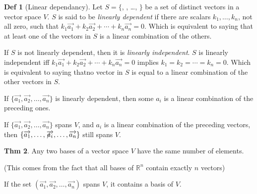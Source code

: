 \documentclass{article}
\theoremstyle{definition}
\newtheorem{definition}{Def}[section]
\newtheorem{theorem}[definition]{Thm}
\newcommand{\crossover}{\hspace{-0pt}\not\hspace{-2pt}}
\begin{document}
\begin{definition}[Linear dependancy]
    Let $S = \{$, , \ldots, $\}$ be a set of distinct vectors in a vector space $V$. $S$ is said to be \emph{linearly dependent} if there are scalars $k_1, \ldots, k_n$, not all zero, such that $k_1 \overrightarrow{a_1} + k_2 \overrightarrow{a_2} + \cdots + k_n \overrightarrow{a_n} = 0$.
    Which is equivalent to saying that at least one of the vectors in $S$ is a linear combination of the others.

    If $S$ is not linearly dependent, then it is \emph{linearly independent}. $S$ is linearly independent iff $k_1 \overrightarrow{a_1} + k_2 \overrightarrow{a_2} + \cdots + k_n \overrightarrow{a_n}=0$ implies $k_1 = k_2 = \cdots =  k_n =0$.
    Which is equivalent to saying thatno vector in $S$ is equal to a linear combination of the other vectors in $S$.
\end{definition}

If $\{ \overrightarrow{a_1}, \overrightarrow{a_2}, \ldots, \overrightarrow{a_n} \}$ is linearly dependent, then some $a_i$ is a linear combination of the preceding ones.

If $\{ \overrightarrow{a_1}, \overrightarrow{a_2}, \ldots, \overrightarrow{a_n} \}$ spans $V$, and $a_i$ is a linear combination of the preceding vectors, then $\{ \overrightarrow{a_1}, \ldots, \crossover{\overrightarrow{a_i}}, \ldots, \overrightarrow{a_n} \}$ still spans $V$.


\begin{theorem}
    Any two bases of a vector space $V$ have the same number of elements.

    (This comes from the fact that all bases of $\mathbb{R}^n$ contain exactly $n$ vectors)
\end{theorem}

If the  set $(\overrightarrow{a_1}, \overrightarrow{a_2}, \ldots, \overrightarrow{a_n})$ spans $V$, it contains a basis of $V$.

\end{document}
